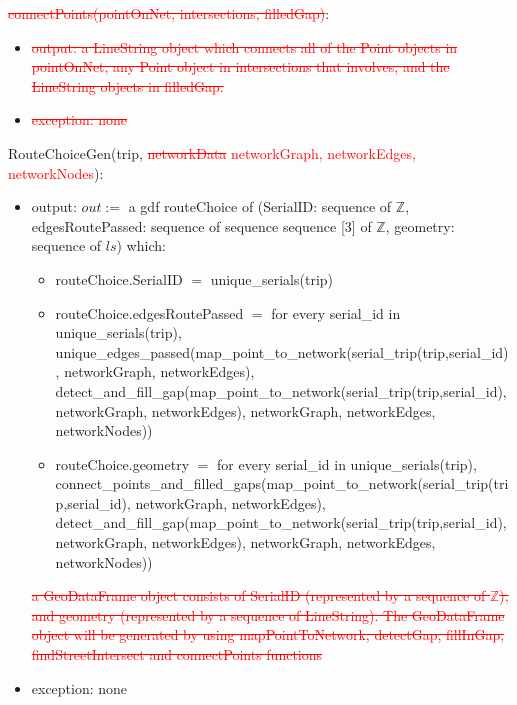 \documentclass[12pt, titlepage]{article}
\begin{document}
\noindent \textcolor{red}{\sout{connectPoints(pointOnNet, intersections, filledGap)}}:
\begin{itemize}
\item \textcolor{red}{\sout{output: a LineString object which connects all of the Point objects in pointOnNet, any Point object in intersections that involves, and the LineString objects in filledGap.}}
\item \textcolor{red}{\sout{exception: none}}
\end{itemize}

\noindent RouteChoiceGen(trip, \textcolor{red}{\sout{networkData} networkGraph, networkEdges, networkNodes}):
\begin{itemize}
\item output: 
$out := $ \newline 
a gdf routeChoice of (SerialID: sequence of $\mathbb{Z}$, edgesRoutePassed: sequence of sequence sequence [3] of $\mathbb{Z}$, geometry: sequence of $ls$) which:
\begin{itemize}
    \item routeChoice.SerialID $=$ unique\_serials(trip)
    \item routeChoice.edgesRoutePassed $=$ for every serial\_id in unique\_serials(trip), \newline unique\_edges\_passed(map\_point\_to\_network(serial\_trip(trip,serial\_id), networkGraph, networkEdges),
    detect\_and\_fill\_gap(map\_point\_to\_network(serial\_trip(trip,serial\_id), networkGraph, networkEdges), networkGraph, networkEdges, networkNodes)) 
    \item routeChoice.geometry $=$ for every serial\_id in unique\_serials(trip), \newline  connect\_points\_and\_filled\_gaps(map\_point\_to\_network(serial\_trip(trip,serial\_id), \newline networkGraph, networkEdges), \newline detect\_and\_fill\_gap(map\_point\_to\_network(serial\_trip(trip,serial\_id), networkGraph, networkEdges), networkGraph, networkEdges, networkNodes))
\end{itemize} 

\textcolor{red}{\sout{a GeoDataFrame object consists of SerialID (represented by a sequence of $\mathbb{Z}$), and geometry (represented by a sequence of LineString). The GeoDataFrame object will be generated by using mapPointToNetwork, detectGap, fillInGap, findStreetIntersect and connectPoints functions}}
\item exception: none
\end{itemize}
\end{document}
